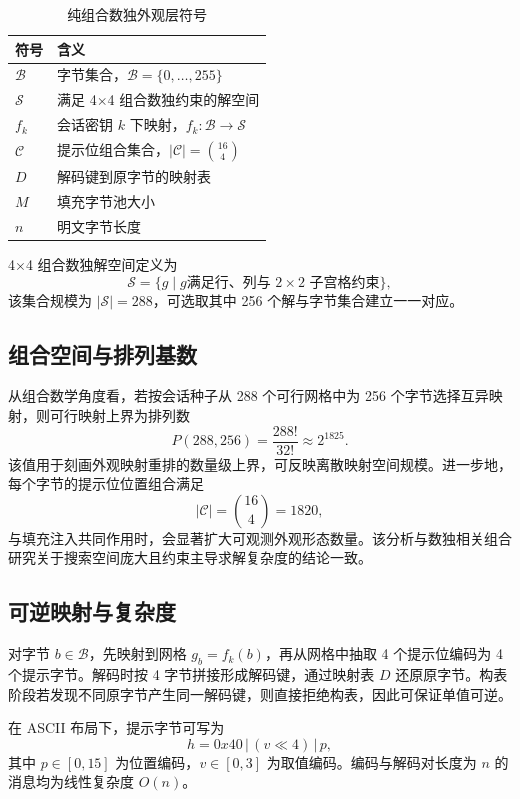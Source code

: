 \begin{table}[htbp]
\centering
\small
\caption{纯组合数独外观层符号}
\label{tab:c2-symbols}
\begin{tabular}{p{2.3cm}p{8.9cm}}
\toprule
符号 & 含义 \\
\midrule
$\mathcal{B}$ & 字节集合，$\mathcal{B}=\{0,\ldots,255\}$ \\
$\mathcal{S}$ & 满足 4$\times$4 组合数独约束的解空间 \\
$f_k$ & 会话密钥 $k$ 下映射，$f_k:\mathcal{B}\rightarrow\mathcal{S}$ \\
$\mathcal{C}$ & 提示位组合集合，$|\mathcal{C}|=\binom{16}{4}$ \\
$D$ & 解码键到原字节的映射表 \\
$M$ & 填充字节池大小 \\
$n$ & 明文字节长度 \\
\bottomrule
\end{tabular}
\end{table}

4$\times$4 组合数独解空间定义为
\[
\mathcal{S}=\{g\mid g \text{满足行、列与 }2\times2\text{ 子宫格约束}\},
\]
该集合规模为 $|\mathcal{S}|=288$，可选取其中 256 个解与字节集合建立一一对应\cite{oeisA107739,oeisA109252}。

\subsection{组合空间与排列基数}
从组合数学角度看，若按会话种子从 288 个可行网格中为 256 个字节选择互异映射，则可行映射上界为排列数
\[
P(288,256)=\frac{288!}{32!}\approx 2^{1825}.
\]
该值用于刻画外观映射重排的数量级上界，可反映离散映射空间规模。进一步地，每个字节的提示位位置组合满足
\[
|\mathcal{C}|=\binom{16}{4}=1820,
\]
与填充注入共同作用时，会显著扩大可观测外观形态数量。该分析与数独相关组合研究关于搜索空间庞大且约束主导求解复杂度的结论一致\cite{lynce2006satgrid}。

\subsection{可逆映射与复杂度}
对字节 $b\in\mathcal{B}$，先映射到网格 $g_b=f_k(b)$，再从网格中抽取 4 个提示位编码为 4 个提示字节。解码时按 4 字节拼接形成解码键，通过映射表 $D$ 还原原字节。构表阶段若发现不同原字节产生同一解码键，则直接拒绝构表，因此可保证单值可逆。

在 ASCII 布局下，提示字节可写为
\[
h = 0x40 \,|\, (v \ll 4)\,|\, p,
\]
其中 $p\in[0,15]$ 为位置编码，$v\in[0,3]$ 为取值编码。编码与解码对长度为 $n$ 的消息均为线性复杂度 $O(n)$。

